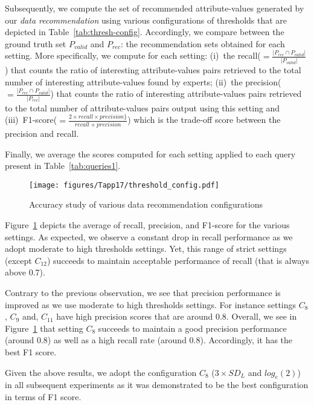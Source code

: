 Subsequently, we compute the set of recommended attribute-values generated by our \emph{data recommendation} using various configurations of thresholds that are depicted in Table~\ref{tab:thresh-config}. Accordingly, we compare between the ground truth set $P_{valid}$ and $P_{rec}$: the recommendation sets obtained for each setting.
More specifically, we compute for each setting: 
(i)~the recall($=\frac{|P_{rec} \cap P_{valid}|}{|P_{valid}|}$) that counts the ratio of interesting attribute-values pairs retrieved to the total number of interesting attribute-values found by experts;
(ii)~the precision($=\frac{|P_{rec} \cap P_{valid}|}{|P_{rec}|}$) that counts the ratio of interesting attribute-values pairs retrieved to the total number of attribute-values pairs output using this setting and (iii)~F1-score($=\frac{2 \times recall \times precision\}}{recall + precision}$) which is the trade-off score between the precision and recall. 



Finally, we average the scores computed for each setting applied to each query present in Table~\ref{tab:queries1}.


  \begin{figure}[t]
\centering
\texttt{[image: figures/Tapp17/threshold\_config.pdf]}
\caption{Accuracy study of various data recommendation configurations}
\label{fig:thresh-study}
\end{figure}



Figure~\ref{fig:thresh-study} depicts the average of recall, precision, and F1-score for the various settings.
As expected, we observe a constant drop in recall performance as we adopt moderate to high thresholds settings. 
 Yet, this range of strict settings (except $C_{12}$) succeeds to maintain acceptable performance of recall (that is always above 0.7).

 Contrary to the previous observation, we see that precision performance is improved as we use moderate to high thresholds settings.  
For instance settings $C_{8}$, $C_{9}$ and, $C_{11}$ have high precision scores that are around 0.8.
Overall, we see in Figure~\ref{fig:thresh-study}  that setting $C_{8}$ succeeds to maintain a good precision performance (around 0.8) as well as a high recall rate (around 0.8). Accordingly, it has the best F1 score.


Given the above results, we adopt the configuration $C_{8}$ ($3 \times SD_{L}$  and $log_e(2)$) in all subsequent experiments as it was demonstrated to be the best configuration in terms of F1 score. 
 





